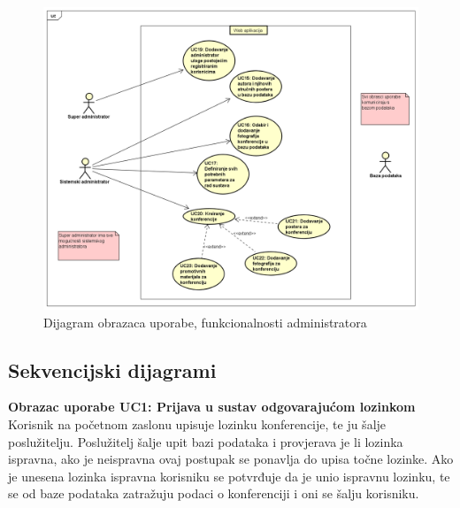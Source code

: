 					\begin{figure}[H]
						\includegraphics[width=\textwidth]{slike/adminUseCase.PNG} %
						\caption{Dijagram obrazaca uporabe, funkcionalnosti administratora}
						\label{fig:admin-dijagram} %
					\end{figure}
					
				\eject		
				
			\subsection{Sekvencijski dijagrami}
						
				\textbf{Obrazac uporabe UC1: Prijava u sustav odgovarajućom lozinkom}\\
				Korisnik na početnom zaslonu upisuje lozinku konferencije, te ju šalje poslužitelju. Poslužitelj šalje upit bazi podataka i provjerava je li lozinka ispravna, ako je neispravna ovaj postupak se ponavlja do upisa točne lozinke. Ako je unesena lozinka ispravna korisniku se potvrđuje da je unio ispravnu lozinku, te se od baze podataka zatražuju podaci o konferenciji i oni se šalju korisniku.
				
